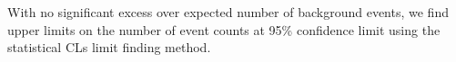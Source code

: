 \vspace{5mm} 
With no significant excess over expected number of background events, we find upper limits on the number of event counts at 95\% confidence limit using the statistical CLs limit finding method.

